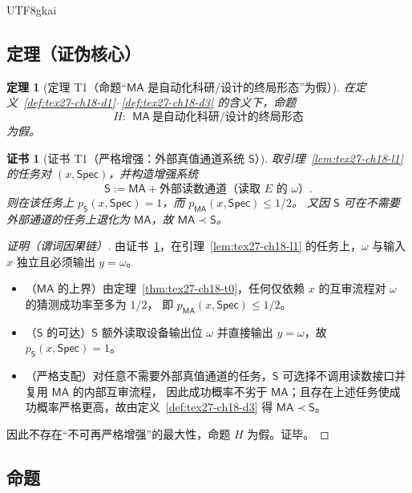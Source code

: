 \documentclass[12pt]{article}
\newtheorem{theorem}{定理}[section]
\newtheorem{Certificate}{证书}[section]
\begin{document}
\begin{CJK*}{UTF8}{gkai}
\subsection{定理（证伪核心）}
\label{subsec:tex27-ch18-theorems}

\begin{theorem}[定理 T1（命题“$\mathsf{MA}$ 是自动化科研/设计的终局形态”为假）]
\label{thm:tex27-ch18-t1}
在定义~\ref{def:tex27-ch18-d1}--\ref{def:tex27-ch18-d3} 的含义下，命题
\[
  H:\ \ \mathsf{MA}\ \text{是自动化科研/设计的终局形态}
\]
为假。
\end{theorem}

\begin{Certificate}[证书 T1（严格增强：外部真值通道系统 $\mathsf{S}$）]
\label{cert:tex27-ch18-t1}
取引理~\ref{lem:tex27-ch18-l1} 的任务对 $(x,\mathsf{Spec})$，并构造增强系统
\[
  \mathsf{S}:=\mathsf{MA}+\text{外部读数通道（读取 $E$ 的 $\omega$）}.
\]
则在该任务上 $p_{\mathsf{S}}(x,\mathsf{Spec})=1$，而 $p_{\mathsf{MA}}(x,\mathsf{Spec})\le 1/2$。
又因 $\mathsf{S}$ 可在不需要外部通道的任务上退化为 $\mathsf{MA}$，故 $\mathsf{MA}\prec \mathsf{S}$。
\end{Certificate}

\begin{proof}[证明（谓词因果链）]
由证书~\ref{cert:tex27-ch18-t1}，在引理~\ref{lem:tex27-ch18-l1} 的任务上，$\omega$ 与输入 $x$ 独立且必须输出 $y=\omega$。
\begin{itemize}
  \item（$\mathsf{MA}$ 的上界）由定理~\ref{thm:tex27-ch18-t0}，任何仅依赖 $x$ 的互审流程对 $\omega$ 的猜测成功率至多为 $1/2$，
  即 $p_{\mathsf{MA}}(x,\mathsf{Spec})\le 1/2$。
  \item（$\mathsf{S}$ 的可达）$\mathsf{S}$ 额外读取设备输出位 $\omega$ 并直接输出 $y=\omega$，故 $p_{\mathsf{S}}(x,\mathsf{Spec})=1$。
  \item（严格支配）对任意不需要外部真值通道的任务，$\mathsf{S}$ 可选择不调用读数接口并复用 $\mathsf{MA}$ 的内部互审流程，
  因此成功概率不劣于 $\mathsf{MA}$；且存在上述任务使成功概率严格更高，故由定义~\ref{def:tex27-ch18-d3} 得 $\mathsf{MA}\prec \mathsf{S}$。
\end{itemize}
因此不存在“不可再严格增强”的最大性，命题 $H$ 为假。证毕。
\end{proof}

\subsection{命题}
\label{subsec:tex27-ch18-propositions}


\end{CJK*}
\end{document}
